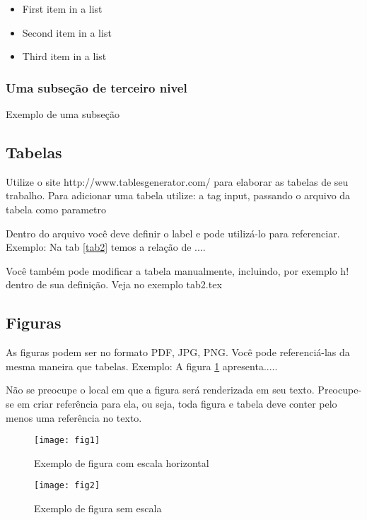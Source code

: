 \documentclass[	DIV=calc,%
							paper=a4,%
							fontsize=12pt,%
							onecolumn]{scrartcl}	 					%
\begin{document}
\begin{itemize}
	\item First item in a list 
	\item Second item in a list 
	\item Third item in a list
\end{itemize}

\subsubsection{Uma subseção de terceiro nivel}

Exemplo de uma subseção

\subsection{Tabelas}

Utilize o site http://www.tablesgenerator.com/ para elaborar as tabelas de seu trabalho.
Para adicionar uma tabela utilize: a tag input, passando o arquivo da tabela como parametro



Dentro do arquivo você deve definir o label e pode utilizá-lo para referenciar. Exemplo:
Na tab \ref{tab2} temos a relação de ....


Você também pode modificar a tabela manualmente, incluindo, por exemplo h! dentro de sua definição. Veja no exemplo tab2.tex

\subsection{Figuras}

As figuras podem ser no formato PDF, JPG, PNG. Você pode referenciá-las da mesma maneira que tabelas. Exemplo: A figura \ref{fig1} apresenta.....

Não se preocupe o local em que a figura será renderizada em seu texto. Preocupe-se em criar referência para ela, ou seja, toda figura e tabela deve conter pelo menos uma referência no texto.

\begin{figure}
\centering
\texttt{[image: fig1]}
\caption{Exemplo de figura com escala horizontal}
\label{fig1}
\end{figure}


\begin{figure}
	\centering
	\texttt{[image: fig2]}
	\caption{Exemplo de figura sem escala}
	\label{fig2}
\end{figure}
\end{document}
